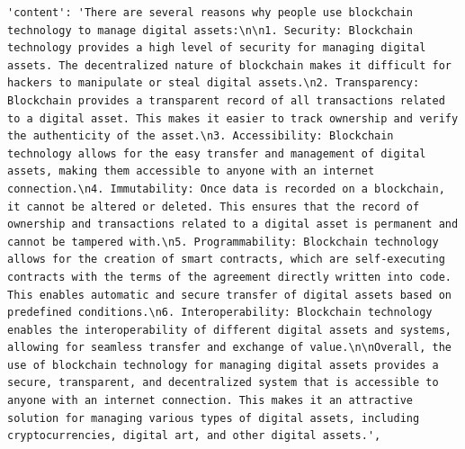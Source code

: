 \documentclass[preprint]{article}
\begin{document}
\begin{lstlisting}[breaklines=true]
  'content': 'There are several reasons why people use blockchain technology to manage digital assets:\n\n1. Security: Blockchain technology provides a high level of security for managing digital assets. The decentralized nature of blockchain makes it difficult for hackers to manipulate or steal digital assets.\n2. Transparency: Blockchain provides a transparent record of all transactions related to a digital asset. This makes it easier to track ownership and verify the authenticity of the asset.\n3. Accessibility: Blockchain technology allows for the easy transfer and management of digital assets, making them accessible to anyone with an internet connection.\n4. Immutability: Once data is recorded on a blockchain, it cannot be altered or deleted. This ensures that the record of ownership and transactions related to a digital asset is permanent and cannot be tampered with.\n5. Programmability: Blockchain technology allows for the creation of smart contracts, which are self-executing contracts with the terms of the agreement directly written into code. This enables automatic and secure transfer of digital assets based on predefined conditions.\n6. Interoperability: Blockchain technology enables the interoperability of different digital assets and systems, allowing for seamless transfer and exchange of value.\n\nOverall, the use of blockchain technology for managing digital assets provides a secure, transparent, and decentralized system that is accessible to anyone with an internet connection. This makes it an attractive solution for managing various types of digital assets, including cryptocurrencies, digital art, and other digital assets.',

\end{lstlisting}
\end{document}

